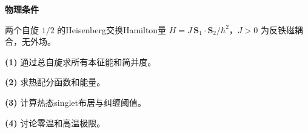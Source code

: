 \textbf{物理条件}\par 两个自旋 \(1/2\) 的Heisenberg交换Hamilton量 \(H=J\,\boldsymbol S_1\cdot\boldsymbol S_2/\hbar^2\)，\(J>0\) 为反铁磁耦合，无外场。
\par\noindent\textbf{(1)} 通过总自旋求所有本征能和简并度。
\par\noindent\textbf{(2)} 求热配分函数和能量。
\par\noindent\textbf{(3)} 计算热态singlet布居与纠缠阈值。
\par\noindent\textbf{(4)} 讨论零温和高温极限。
